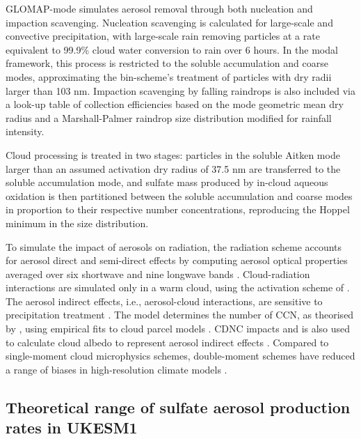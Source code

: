 GLOMAP-mode simulates aerosol removal through both nucleation and impaction scavenging. Nucleation scavenging is calculated for large-scale and convective precipitation, with large-scale rain removing particles at a rate equivalent to 99.9\% cloud water conversion to rain over 6 hours. In the modal framework, this process is restricted to the soluble accumulation and coarse modes, approximating the bin-scheme's treatment of particles with dry radii larger than 103 nm. Impaction scavenging by falling raindrops is also included via a look-up table of collection efficiencies based on the mode geometric mean dry radius and a Marshall-Palmer raindrop size distribution modified for rainfall intensity.


Cloud processing is treated in two stages: particles in the soluble Aitken mode larger than an assumed activation dry radius of 37.5 nm are transferred to the soluble accumulation mode, and sulfate mass produced by in-cloud aqueous oxidation is then partitioned between the soluble accumulation and coarse modes in proportion to their respective number concentrations, reproducing the Hoppel minimum in the size distribution.

To simulate the impact of aerosols on radiation, the radiation scheme accounts for aerosol direct and semi-direct effects by computing aerosol optical properties averaged over six shortwave and nine longwave bands \citep{bellouinImpactModalAerosol2013}. Cloud-radiation interactions are simulated only in a warm cloud, using the activation scheme of \citet{abdul-razzakParameterizationAerosolActivation2000}. The aerosol indirect effects, i.e., aerosol-cloud interactions, are sensitive to precipitation treatment \citep{gettelmanAdvancedTwoMomentBulk2015}. The model determines the number of CCN, as theorised by \citet{kohlerNucleusGrowthHygroscopic1936}, using empirical fits to cloud parcel models \citep{mulcahyDescriptionEvaluationAerosol2020}. CDNC impacts \Reff{} and is also used to calculate cloud albedo to represent aerosol indirect effects \citep{bellouinImpactModalAerosol2013}. Compared to single-moment cloud microphysics schemes, double-moment schemes have reduced a range of biases in high-resolution climate models \citep{seikiImprovementGlobalCloudSystemResolving2015}.



\subsection{Theoretical range of sulfate aerosol production rates in UKESM1}

